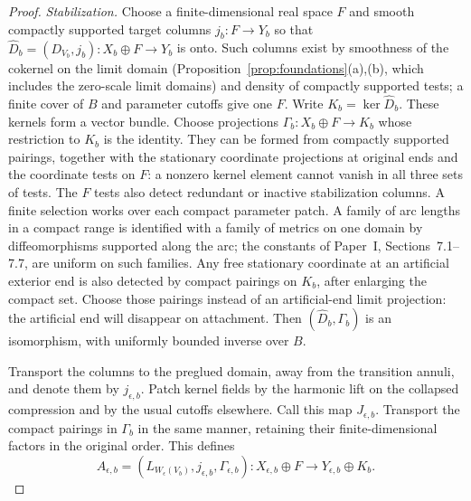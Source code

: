 \documentclass[11pt]{amsart}
\theoremstyle{definition}
\theoremstyle{remark}
\theoremstyle{plain}
\numberwithin{equation}{section}
\begin{document}
\begin{proof}
\emph{Stabilization.} Choose a finite-dimensional real space $F$
and smooth compactly supported target columns
$j_b:F\to Y_b$ so that
$\widehat D_b=(D_{V_b},j_b):X_b\oplus F\to Y_b$ is onto.
Such columns exist by smoothness of the cokernel on the limit domain
(Proposition~\ref{prop:foundations}(a),(b), which includes the
zero-scale limit domains) and density of
compactly supported tests; a finite cover of $B$ and parameter
cutoffs give one $F$. Write $K_b=\ker\widehat D_b$. These kernels
form a vector bundle. Choose projections $\Gamma_b:X_b\oplus F\to K_b$
whose restriction to $K_b$ is the identity. They can be formed
from compactly supported pairings, together with the stationary
coordinate projections at original ends and the coordinate tests
on $F$: a nonzero
kernel element cannot vanish in all three sets of tests. The $F$
tests also detect redundant or inactive stabilization columns.
A finite selection works over each compact parameter patch. A family of
arc lengths in a compact range is identified with a family of metrics on
one domain by diffeomorphisms supported along the arc; the constants of
Paper~I, Sections~7.1--7.7, are uniform on such families.
Any free stationary coordinate at an artificial exterior end is
also detected by compact pairings on $K_b$, after enlarging the
compact set. Choose those pairings instead of an artificial-end
limit projection: the artificial end will disappear on attachment.
Then $(\widehat D_b,\Gamma_b)$ is an isomorphism, with uniformly
bounded inverse over $B$.

Transport the columns to the preglued domain, away from the
transition annuli, and denote them by $j_{\epsilon,b}$. Patch
kernel fields by the harmonic lift on the collapsed compression
and by the usual cutoffs elsewhere. Call this map $J_{\epsilon,b}$.
Transport the compact pairings in $\Gamma_b$ in the same manner,
retaining their finite-dimensional factors in the original order.
This defines
\[
 A_{\epsilon,b}=(L_{W_\epsilon(V_b)},j_{\epsilon,b},
                         \Gamma_{\epsilon,b}):
 X_{\epsilon,b}\oplus F\longrightarrow Y_{\epsilon,b}\oplus K_b.
\]


\end{proof}
\end{document}
